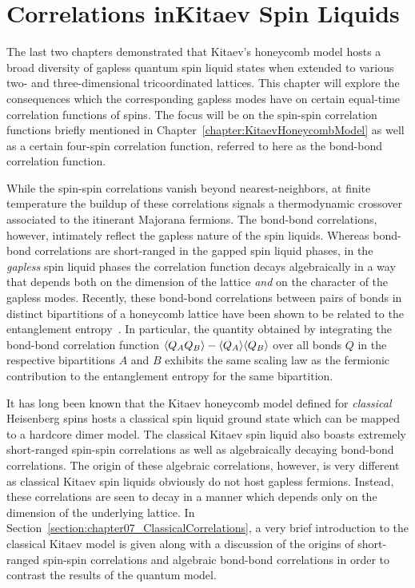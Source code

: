 \chapter[Correlations in Kitaev Spin Liquids]{Correlations in\linebreak Kitaev Spin Liquids}
\label{chapter:SpinCorrelationsOfKSL}
%
%
The last two chapters demonstrated that Kitaev's honeycomb model hosts a broad diversity of gapless quantum spin liquid states when extended to various two- and three-dimensional tricoordinated lattices.
This chapter will explore the consequences which the corresponding gapless modes have on certain equal-time correlation functions of spins.
The focus will be on the spin-spin correlation functions briefly mentioned in Chapter~\ref{chapter:KitaevHoneycombModel} as well as a certain four-spin correlation function, referred to here as the bond-bond correlation function.

While the spin-spin correlations vanish beyond nearest-neighbors, at finite temperature the buildup of these correlations signals a thermodynamic crossover associated to the itinerant Majorana fermions.
The bond-bond correlations, however, intimately reflect the gapless nature of the spin liquids.
Whereas bond-bond correlations are short-ranged in the gapped spin liquid phases, in the \textit{gapless} spin liquid phases the correlation function decays algebraically in a way that depends both on the dimension of the lattice \textit{and} on the character of the gapless modes.
Recently, these bond-bond correlations between pairs of bonds in distinct bipartitions of a honeycomb lattice have been shown to be related to the entanglement entropy~\cite{YangARXIV2019}.
In particular, the quantity obtained by integrating the bond-bond correlation function $\langle Q_A Q_B \rangle - \langle Q_A \rangle \langle Q_B \rangle$ over all bonds $Q$ in the respective bipartitions $A$ and $B$ exhibits the same scaling law as the fermionic contribution to the entanglement entropy for the same bipartition.

It has long been known that the Kitaev honeycomb model defined for \textit{classical} Heisenberg spins hosts a classical spin liquid ground state which can be mapped to a hardcore dimer model.
The classical Kitaev spin liquid also boasts extremely short-ranged spin-spin correlations as well as algebraically decaying bond-bond correlations.
The origin of these algebraic correlations, however, is very different as classical Kitaev spin liquids obviously do not host gapless fermions.
Instead, these correlations are seen to decay in a manner which depends only on the dimension of the underlying lattice.
In Section~\ref{section:chapter07_ClassicalCorrelations}, a very brief introduction to the classical Kitaev model is given along with a discussion of the origins of short-ranged spin-spin correlations and algebraic bond-bond correlations in order to contrast the results of the quantum model.

